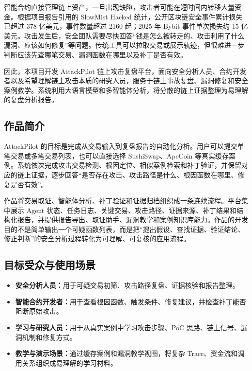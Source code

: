 \documentclass[UTF8,a4paper,12pt]{ctexart}
\begin{document}
智能合约直接管理链上资产，一旦出现缺陷，攻击者可能在短时间内转移大量资金。根据项目报告引用的 SlowMist Hacked 统计，公开区块链安全事件累计损失已超过 378 亿美元，事件数量超过 2160 起；2025 年 Bybit 事件单次损失约 15 亿美元。攻击发生后，安全团队需要尽快回答“钱是怎么被转走的、攻击利用了什么漏洞、应该如何修复”等问题。传统工具可以拉取交易或展示轨迹，但很难进一步判断应该先查哪笔交易、漏洞函数在哪里以及补丁是否有效。\par

因此，本项目开发 AttackPilot 链上攻击复盘平台，面向安全分析人员、合约开发者以及希望理解链上攻击本质的研究人员，服务于链上事故复盘、漏洞修复和安全案例教学。系统利用大语言模型和多智能体分析，将分散的链上证据整理为易理解的复盘分析报告。

\subsection{作品简介}

AttackPilot 的目标是完成从交易输入到复盘报告的自动化分析。用户可以提交单笔交易或多笔交易列表，也可以直接选择 SushiSwap、ApeCoin 等真实缓存案例。系统依次完成攻击交易检测、根因定位、相似案例检索和补丁验证，并保留对应的链上证据，逐步回答“是否存在攻击、攻击路径是什么、根因函数在哪里、修复是否有效”。\par

作品将交易取证、智能体分析、补丁验证和证据归档组织成一条连续流程。平台集中展示 Agent 状态、任务日志、关键交易、攻击路径、证据来源、补丁结果和结构化报告，并提供报告导出、取证助手、漏洞教学和案例知识库能力。作品的开发目的不是简单输出一个可疑函数列表，而是把“提出假设、查找证据、验证结论、修正判断”的安全分析过程转化为可理解、可复核的应用流程。

\subsection{目标受众与使用场景}

\begin{itemize}[leftmargin=2.5em]
  \item \textbf{安全分析人员：}用于可疑交易初筛、攻击路径复盘、证据核验和报告整理。
  \item \textbf{智能合约开发者：}用于查看根因函数、触发条件、修复建议，并检查补丁能否阻断原始攻击。
  \item \textbf{学习与研究人员：}用于从真实案例中学习攻击步骤、PoC 思路、链上信号、漏洞机制和修复方式。
  \item \textbf{教学与演示场景：}通过缓存案例和漏洞教学视图，将复杂 Trace、资金流和调用关系组织成易理解的学习材料。
\end{itemize}
\end{document}
